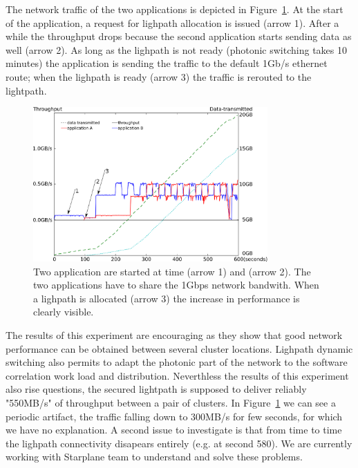 The network traffic of the two applications is depicted in
Figure~\ref{fig:timing}.  At the start of the application, a request
for lighpath allocation is issued (arrow 1). After a while the
throughput drops because the second application starts sending data as
well (arrow 2).  As long as the lighpath is not ready (photonic
switching takes 10 minutes) the application is sending the traffic to
the default 1Gb/s ethernet route; when the lighpath is ready (arrow 3)
the traffic is rerouted to the lightpath.

\begin{figure}[ht]
  \centering
  \includegraphics[width=0.8\textwidth] {img/timing.eps}
  \caption{\label{fig:timing} Two application are started at time
    (arrow 1) and (arrow 2). The two applications have to share the
    1Gbps network bandwith. When a lighpath is allocated (arrow 3) the
    increase in performance is clearly visible.}
\end{figure} 

The results of this experiment are encouraging as they show that good
network performance can be obtained between several cluster
locations. Lighpath dynamic switching also permits to adapt the
photonic part of the network to the software correlation work load and
distribution.  Neverthless the results of this experiment also rise
questions, the secured lightpath is supposed to deliver reliably
"550MB/s" of throughput between a pair of clusters.  In
Figure~\ref{fig:timing} we can see a periodic artifact, the traffic
falling down to 300MB/s for few seconds, for which we have no
explanation. A second issue to investigate is that from time to time
the lighpath connectivity disapears entirely (e.g. at second 580). We
are currently working with Starplane team to understand and solve
these problems.


